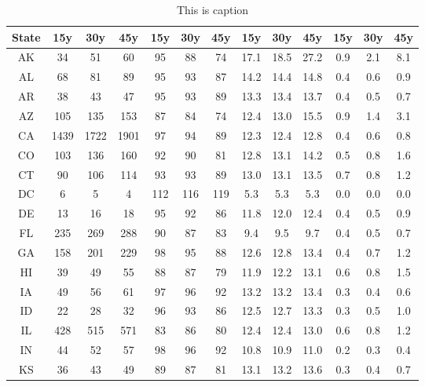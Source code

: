 \begin{table}
\centering
\caption{This is caption}
\label{tab:forecast_table}
\begin{tabular}{ccccccccccccc}
\toprule
State &   15y &   30y &   45y &  15y &  30y &  45y &  15y &  30y &  45y & 15y & 30y & 45y \\
\midrule
   AK &    34 &    51 &    60 &   95 &   88 &   74 & 17.1 & 18.5 & 27.2 & 0.9 & 2.1 & 8.1 \\
   AL &    68 &    81 &    89 &   95 &   93 &   87 & 14.2 & 14.4 & 14.8 & 0.4 & 0.6 & 0.9 \\
   AR &    38 &    43 &    47 &   95 &   93 &   89 & 13.3 & 13.4 & 13.7 & 0.4 & 0.5 & 0.7 \\
   AZ &   105 &   135 &   153 &   87 &   84 &   74 & 12.4 & 13.0 & 15.5 & 0.9 & 1.4 & 3.1 \\
   CA &  1439 &  1722 &  1901 &   97 &   94 &   89 & 12.3 & 12.4 & 12.8 & 0.4 & 0.6 & 0.8 \\
   CO &   103 &   136 &   160 &   92 &   90 &   81 & 12.8 & 13.1 & 14.2 & 0.5 & 0.8 & 1.6 \\
   CT &    90 &   106 &   114 &   93 &   93 &   89 & 13.0 & 13.1 & 13.5 & 0.7 & 0.8 & 1.2 \\
   DC &     6 &     5 &     4 &  112 &  116 &  119 &  5.3 &  5.3 &  5.3 & 0.0 & 0.0 & 0.0 \\
   DE &    13 &    16 &    18 &   95 &   92 &   86 & 11.8 & 12.0 & 12.4 & 0.4 & 0.5 & 0.9 \\
   FL &   235 &   269 &   288 &   90 &   87 &   83 &  9.4 &  9.5 &  9.7 & 0.4 & 0.5 & 0.7 \\
   GA &   158 &   201 &   229 &   98 &   95 &   88 & 12.6 & 12.8 & 13.4 & 0.4 & 0.7 & 1.2 \\
   HI &    39 &    49 &    55 &   88 &   87 &   79 & 11.9 & 12.2 & 13.1 & 0.6 & 0.8 & 1.5 \\
   IA &    49 &    56 &    61 &   97 &   96 &   92 & 13.2 & 13.2 & 13.4 & 0.3 & 0.4 & 0.6 \\
   ID &    22 &    28 &    32 &   96 &   93 &   86 & 12.5 & 12.7 & 13.3 & 0.3 & 0.5 & 1.0 \\
   IL &   428 &   515 &   571 &   83 &   86 &   80 & 12.4 & 12.4 & 13.0 & 0.6 & 0.8 & 1.2 \\
   IN &    44 &    52 &    57 &   98 &   96 &   92 & 10.8 & 10.9 & 11.0 & 0.2 & 0.3 & 0.4 \\
   KS &    36 &    43 &    49 &   89 &   87 &   81 & 13.1 & 13.2 & 13.6 & 0.3 & 0.4 & 0.7 \\

\end{tabular}
\end{table}
